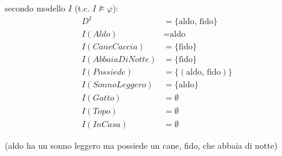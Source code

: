\documentclass[12pt]{article}
\begin{document}
secondo modello $I$ (t.c. $I \not\models \varphi$):
\begin{align*}
D^I &= \{ \text{aldo, fido} \} \\
I(Aldo) &= \text{aldo} \\
I(CaneCaccia) &= \{ \text{fido} \} \\
I(AbbaiaDiNotte) &= \{ \text{fido} \} \\
I(Possiede) &= \{ (\text{aldo, fido}) \} \\
I(SonnoLeggero) &= \{ \text{aldo} \} \\
I(Gatto) &= \emptyset \\
I(Topo) &= \emptyset \\
I(InCasa) &= \emptyset
\end{align*}

(aldo ha un sonno leggero ma possiede un cane, fido, che abbaia di notte)
\end{document}
